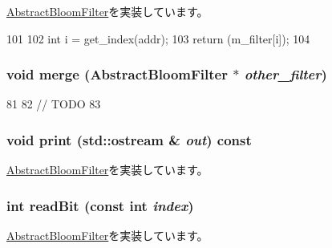 \hyperlink{classAbstractBloomFilter_aa1b69d102655f8c5879b3df95eb205dc}{AbstractBloomFilter}を実装しています。


\begin{DoxyCode}
101 {
102     int i = get_index(addr);
103     return (m_filter[i]);
104 }
\end{DoxyCode}
\hypertarget{classBlockBloomFilter_a4091f5f95de040d4e0ae5bd86817b13c}{
\subsubsection[{merge}]{\setlength{\rightskip}{0pt plus 5cm}void merge ({\bf AbstractBloomFilter} $\ast$ {\em other\_\-filter})}}
\label{classBlockBloomFilter_a4091f5f95de040d4e0ae5bd86817b13c}



\begin{DoxyCode}
81 {
82     // TODO
83 }
\end{DoxyCode}
\hypertarget{classBlockBloomFilter_ac55fe386a101fbae38c716067c9966a0}{
\subsubsection[{print}]{\setlength{\rightskip}{0pt plus 5cm}void print (std::ostream \& {\em out}) const}}
\label{classBlockBloomFilter_ac55fe386a101fbae38c716067c9966a0}


\hyperlink{classAbstractBloomFilter_a3ea5f7af5db62cc24f4e40df9ea5c971}{AbstractBloomFilter}を実装しています。\hypertarget{classBlockBloomFilter_a6f8a98d0f38a8d122d4cbf87323484eb}{
\subsubsection[{readBit}]{\setlength{\rightskip}{0pt plus 5cm}int readBit (const int {\em index})}}
\label{classBlockBloomFilter_a6f8a98d0f38a8d122d4cbf87323484eb}


\hyperlink{classAbstractBloomFilter_a6c0e9a098f0f210aa42eb2f1553804eb}{AbstractBloomFilter}を実装しています。


